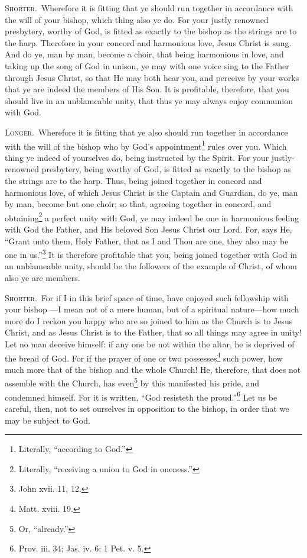 
\textsc{Shorter.}~Wherefore it is fitting that ye should run together in accordance with the will of your bishop, which thing also ye do. For your justly renowned presbytery, worthy of God, is fitted as exactly to the bishop as the strings are to the harp. Therefore in your  concord and harmonious love, Jesus Christ is sung. And do ye, man by man, become a choir, that being harmonious in love, and taking up the song of God in unison, ye may with one voice sing to the Father through Jesus Christ, so that He may both hear you, and perceive by your works that ye are indeed the members of His Son. It is profitable, therefore, that you should live in an unblameable unity, that thus ye may always enjoy communion with God.

\textsc{Longer.}~Wherefore it is fitting that ye also should run together in accordance with the will of the bishop who by God’s appointment\footnote{Literally, “according to God.”} rules over you. Which thing ye indeed of yourselves do, being instructed by the Spirit. For your justly-renowned presbytery, being worthy of God, is fitted as exactly to the bishop as the strings are to the harp. Thus, being joined together in concord and harmonious love, of which Jesus Christ is the Captain and Guardian, do ye, man by man, become but one choir; so that, agreeing together in concord, and obtaining\footnote{Literally, “receiving a union to God in oneness.”} a perfect unity with God, ye may indeed be one in harmonious feeling with God the Father, and His beloved Son Jesus Christ our Lord. For, says He, “Grant unto them, Holy Father, that as I and Thou are one, they also may be one in us.”\footnote{John xvii. 11, 12.} It is therefore profitable that you, being joined together with God in an unblameable unity, should be the followers of the example of Christ, of whom also ye are members.


\textsc{Shorter.}~For if I in this brief space of time, have enjoyed such fellowship with your bishop —I mean not of a mere human, but of a spiritual nature—how much more do I reckon you happy who are so joined to him as the Church is to Jesus Christ, and as Jesus Christ is to the Father, that so all things may agree in unity! Let no man deceive himself: if any one be not within the altar, he is deprived of the bread of God. For if the prayer of one or two possesses\footnote{Matt. xviii. 19.} such power, how much more that of the bishop and the whole Church! He, therefore, that does not assemble with the Church, has even\footnote{Or, “already.”} by this manifested his pride, and condemned himself. For it is written, “God resisteth the proud.”\footnote{Prov. iii. 34; Jas. iv. 6; 1 Pet. v. 5.} Let us be careful, then, not to set ourselves in opposition to the bishop, in order that we may be subject to God.

